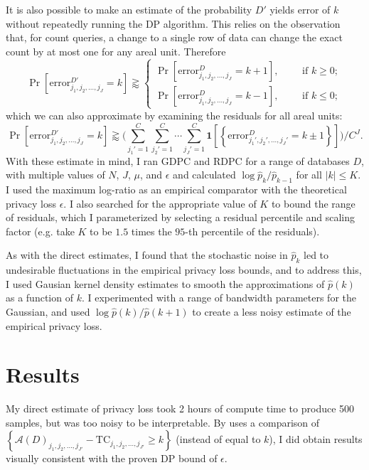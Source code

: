 \documentclass{article}
\begin{document}
It is also possible to make an estimate of the probability $D'$ yields error of $k$ without repeatedly running the DP algorithm.  This relies on the observation that, for count queries, a change to a single row of data can change the exact count by at most one for any areal unit.  Therefore
$$
\Pr\left[\mathrm{error}_{j_1, j_2, \ldots, j_{J}}^{D'}
= k\right]
\gtrapprox
\begin{cases}
\Pr\left[\mathrm{error}_{j_1, j_2, \ldots, j_{J}}^{D}
= k+1\right], \qquad \text{ if } k \geq 0;\\[.1in]
\Pr\left[\mathrm{error}_{j_1, j_2, \ldots, j_{J}}^{D}
= k-1\right], \qquad \text{ if } k \leq 0;
\end{cases}
$$
which we can also approximate by examining the residuals for all areal units:
$$\Pr\left[\mathrm{error}_{j_1, j_2, \ldots, j_{J}}^{D'}
= k\right]
\gtrapprox 
\bigg(\sum_{j_1'=1}^C\sum_{j_2'=1}^C\cdots\sum_{j_J' = 1}^C \mathbf{1}\left[\left\{\mathrm{error}_{j_1', j_2', \ldots, j_{J}'}^D
= k\pm 1\right\}\right]\bigg)\bigg/C^J.
$$
With these estimate in mind, I ran GDPC and RDPC for a range of databases $D$, with multiple values of $N$, $J$, $\mu$, and $\epsilon$ and calculated $\log \hat{p}_k / \hat{p}_{k-1}$ for all $|k| \leq K$. I used the maximum log-ratio as an empirical comparator with the theoretical privacy loss $\epsilon$.  I also searched for the appropriate value of $K$ to bound the range of residuals, which I parameterized by selecting a residual percentile and scaling factor (e.g. take $K$ to be $1.5$ times the $95$-th percentile of the residuals).

As with the direct estimates, I found that the stochastic noise in $\hat{p}_k$ led to undesirable fluctuations in the empirical privacy loss bounds, and to address this, I used Gausian kernel density estimates to smooth the approximations of $\hat{p}(k)$ as a function of $k$.  I experimented with a range of bandwidth parameters for the Gaussian, and used $\log \hat{p}(k) / \hat{p}(k+1)$ to create a less noisy estimate of the empirical privacy loss.

\section{Results}
\label{results}

My direct estimate of privacy loss took 2 hours of compute time to produce 500 samples, but was too noisy to be interpretable.
By uses a comparison of $\left\{\mathcal{A}(D)_{j_1, j_2, \ldots, j_{J'}}
- \mathrm{TC}_{j_1, j_2, \ldots, j_{J'}}
\geq k\right\}$ (instead of equal to $k$), I did obtain results visually consistent with the proven DP bound of $\epsilon$.
\end{document}
